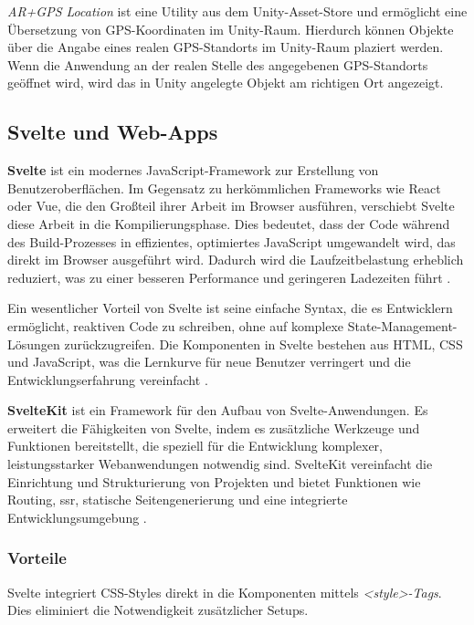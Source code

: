 \textit{AR+GPS Location} ist eine Utility aus dem Unity-Asset-Store und ermöglicht eine Übersetzung von GPS-Koordinaten im Unity-Raum. Hierdurch können Objekte über die Angabe eines realen GPS-Standorts im Unity-Raum plaziert werden. Wenn die Anwendung an der realen Stelle des angegebenen GPS-Standorts geöffnet wird, wird das in Unity angelegte Objekt am richtigen Ort angezeigt. \autocite{ArGpsLocation}

\subsection{Svelte und Web-Apps} \label{cha:grundlagen:swtech:svelte}

\textbf{Svelte} ist ein modernes JavaScript-Framework zur Erstellung von Benutzeroberflächen. Im Gegensatz zu herkömmlichen Frameworks wie React oder Vue, die den Großteil ihrer Arbeit im Browser ausführen, verschiebt Svelte diese Arbeit in die Kompilierungsphase. Dies bedeutet, dass der Code während des Build-Prozesses in effizientes, optimiertes JavaScript umgewandelt wird, das direkt im Browser ausgeführt wird. Dadurch wird die Laufzeitbelastung erheblich reduziert, was zu einer besseren Performance und geringeren Ladezeiten führt \autocite{Svelte2024}.

Ein wesentlicher Vorteil von Svelte ist seine einfache Syntax, die es Entwicklern ermöglicht, reaktiven Code zu schreiben, ohne auf komplexe State-Management-Lösungen zurückzugreifen. Die Komponenten in Svelte bestehen aus HTML, CSS und JavaScript, was die Lernkurve für neue Benutzer verringert und die Entwicklungserfahrung vereinfacht \autocite{Svelte2024}.

\textbf{SvelteKit} ist ein Framework für den Aufbau von Svelte-Anwendungen. Es erweitert die Fähigkeiten von Svelte, indem es zusätzliche Werkzeuge und Funktionen bereitstellt, die speziell für die Entwicklung komplexer, leistungsstarker Webanwendungen notwendig sind. SvelteKit vereinfacht die Einrichtung und Strukturierung von Projekten und bietet Funktionen wie Routing, \ac{ssr}, statische Seitengenerierung und eine integrierte Entwicklungsumgebung \autocite{Svelte2024}.

\subsubsection{Vorteile}

Svelte integriert CSS-Styles direkt in die Komponenten mittels \textit{<style>-Tags}. Dies eliminiert die Notwendigkeit zusätzlicher Setups.


